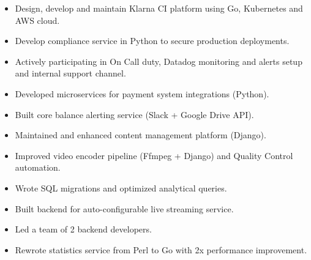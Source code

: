 \documentclass[10pt,a4paper,ragged2e]{altacv}
\begin{document}
\makecvheader


\begin{itemize}
  \item Design, develop and maintain Klarna CI platform using Go, Kubernetes and AWS cloud.
  \item Develop compliance service in Python to secure production deployments.
  \item Actively participating in On Call duty, Datadog monitoring and alerts setup and internal support channel.
\end{itemize}

\divider

\begin{itemize}
  \item Developed microservices for payment system integrations (Python).
  \item Built core balance alerting service (Slack + Google Drive API).
\end{itemize}

\divider

\begin{itemize}
  \item Maintained and enhanced content management platform (Django).
  \item Improved video encoder pipeline (Ffmpeg + Django) and Quality Control automation.
  \item Wrote SQL migrations and optimized analytical queries.
\end{itemize}

\divider

\begin{itemize}
  \item Built backend for auto-configurable live streaming service.
  \item Led a team of 2 backend developers.
  \item Rewrote statistics service from Perl to Go with 2x performance improvement.
\end{itemize}
\end{document}
